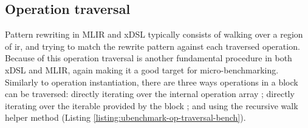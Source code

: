 

\subsection{Operation traversal}
\label{ssec:ubenchmark-operation-traversal}

Pattern rewriting in MLIR and xDSL typically consists of walking over a region of \ac{ir}, and trying to match the rewrite pattern against each traversed operation.
Because of this operation traversal is another fundamental procedure in both xDSL and MLIR, again making it a good target for micro-benchmarking. Similarly to operation instantiation, there are three ways operations in a block can be traversed: directly iterating over the internal operation array ; directly iterating over the iterable provided by the block ; and using the recursive walk helper method  (Listing \ref{listing:ubenchmark-op-traversal-bench}).

